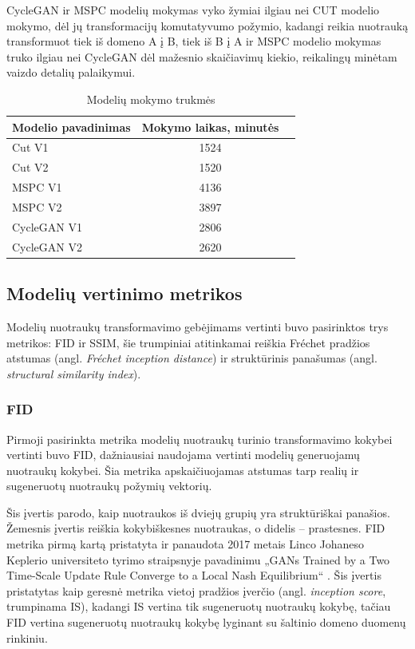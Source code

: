 \documentclass{VUMIFPSbakalaurinis}
\begin{document}
        CycleGAN ir MSPC modelių mokymas vyko žymiai ilgiau nei CUT modelio mokymo, dėl jų transformacijų komutatyvumo požymio, kadangi reikia nuotrauką transformuot tiek iš domeno A į B, tiek iš B į A ir MSPC modelio mokymas truko ilgiau nei CycleGAN dėl mažesnio skaičiavimų kiekio, reikalingų minėtam vaizdo detalių palaikymui.
        \begin{table}[H]\footnotesize
          \centering
          \caption{Modelių mokymo trukmės}
          {\begin{tabular}{|l|c|c|} \hline
            Modelio pavadinimas & Mokymo laikas, minutės\\
            \hline
            Cut V1 & 1524 \\
            Cut V2 & 1520 \\ 
            MSPC V1 & 4136 \\
            MSPC V2 & 3897 \\
            CycleGAN V1 & 2806 \\
            CycleGAN V2 & 2620 \\
            \hline
          \end{tabular}}
          \label{tab:table example}
        \end{table}

    
    \subsection{Modelių vertinimo metrikos}
        Modelių nuotraukų transformavimo gebėjimams vertinti buvo pasirinktos trys metrikos: FID ir SSIM, šie trumpiniai atitinkamai reiškia Fréchet pradžios atstumas (angl. \emph{Fréchet inception distance}) ir struktūrinis panašumas (angl. \emph{structural similarity index}).
        
        \subsubsection{FID}
            Pirmoji pasirinkta metrika modelių nuotraukų turinio transformavimo kokybei vertinti buvo FID, dažniausiai naudojama vertinti modelių generuojamų nuotraukų kokybei. Šia metrika apskaičiuojamas atstumas tarp realių ir sugeneruotų nuotraukų požymių vektorių.
    
            Šis įvertis parodo, kaip nuotraukos iš dviejų grupių yra struktūriškai panašios. Žemesnis įvertis reiškia kokybiškesnes nuotraukas, o didelis – prastesnes. FID metrika pirmą kartą pristatyta ir panaudota 2017 metais Linco Johaneso Keplerio universiteto tyrimo straipsnyje pavadinimu „GANs Trained by a Two Time-Scale Update Rule Converge to a Local Nash Equilibrium“ \cite{FidStart}. Šis įvertis pristatytas kaip geresnė metrika vietoj pradžios įverčio (angl. \emph{inception score}, trumpinama IS), kadangi IS vertina tik sugeneruotų nuotraukų kokybę, tačiau FID vertina sugeneruotų nuotraukų kokybę lyginant su šaltinio domeno duomenų rinkiniu.
\end{document}
